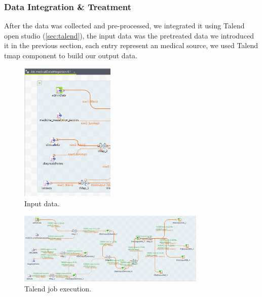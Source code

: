 \newpage

\subsubsection*{Data Integration \& Treatment}


After the data was collected and pre-processed, we integrated it using Talend open studio (\ref{sec:talend}), the input data was the pretreated data we introduced it in the previous section, each entry represent an medical source, we used Talend tmap component to build our output data.

\begin{figure}[h!]
  \center
  \includegraphics[width=0.40\textwidth]{images/chapter3/jobInputs.PNG}
  \caption{Input data.}
  \label{fig:jobinputes}
\end{figure}
\begin{figure}[h!]
  \center
  \includegraphics[width=0.80\textwidth]{images/chapter3/jobresult.PNG}
  \caption{Talend job execution.}
  \label{fig:jobtalend}
\end{figure}
\newpage
